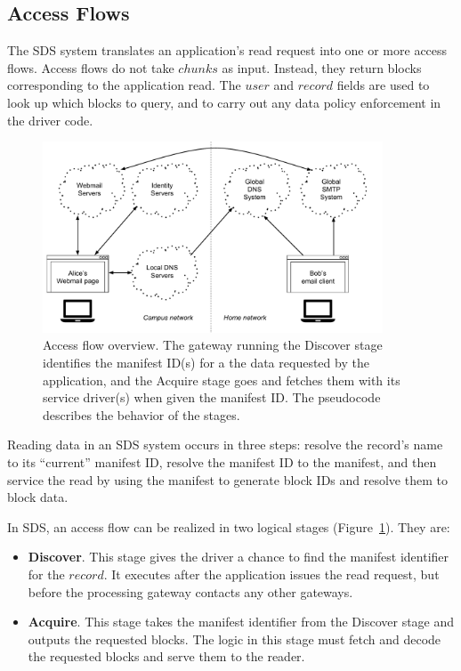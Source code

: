 \subsection{Access Flows}

The SDS system translates an application's read request into one or more access
flows.  Access flows do not take $chunks$ as input.  Instead, they return blocks
corresponding to the application read.  The $user$ and $record$ fields are used
to look up which blocks to query, and to carry out any data policy enforcement
in the driver code.

\begin{figure}[h]
   \centering
   \includegraphics[width=0.9\textwidth,page=7]{figures/dissertation-figures}
   \caption{Access flow overview.  The gateway running the Discover stage
   identifies the manifest ID(s) for a the data requested by the application,
   and the Acquire stage goes and fetches them with its service driver(s)
   when given the manifest ID.  The pseudocode describes the behavior of the
   stages.}
   \label{fig:chap2-access-flow}
\end{figure}

Reading data in an SDS system occurs in three steps:  resolve the record's name
to its ``current'' manifest ID, resolve the manifest ID to the manifest, and
then service the read by using the manifest to generate block IDs and resolve
them to block data.

In SDS, an access flow can be realized in two logical stages
(Figure~\ref{fig:chap2-access-flow}).  They are:

\begin{itemize}
    \item \textbf{Discover}.  This stage gives the driver a chance to find the
manifest identifier for the $record$.  It executes after the application issues
the read request, but before the processing gateway contacts any other gateways.
    \item \textbf{Acquire}.  This stage takes the manifest identifier from the
Discover stage and outputs the requested blocks.  The logic in this 
stage must fetch and decode the requested blocks and serve them to the reader.
\end{itemize}

